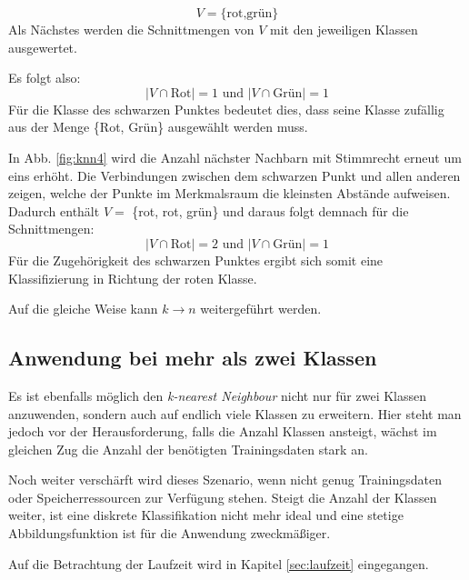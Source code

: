 \documentclass[fontsize=11pt]{scrartcl}
\begin{document}
                $$
                    V=\{\text{rot,grün}\}
                $$ 
                Als Nächstes werden die Schnittmengen von $V$ mit den jeweiligen Klassen ausgewertet.\par 
                Es folgt also:
                $$
                    |V \cap \text{Rot}| = 1 \text{ und } | V \cap \text{Grün} | = 1
                $$
                Für die Klasse des schwarzen Punktes bedeutet dies, dass seine Klasse zufällig aus der Menge \{Rot, Grün\} ausgewählt werden muss.     
                \par
            	In Abb. \ref{fig:knn4} wird die Anzahl nächster Nachbarn mit Stimmrecht erneut um eins erhöht. Die Verbindungen zwischen dem schwarzen Punkt und allen anderen zeigen, welche der Punkte im Merkmalsraum die kleinsten Abstände aufweisen. Dadurch enthält $V=$ \{rot, rot, grün\} und daraus folgt demnach für die Schnittmengen:
                $$
                    |V \cap \text{Rot} | = 2 \text{ und } | V \cap \text{Grün} | = 1
                $$
            	Für die Zugehörigkeit des schwarzen Punktes ergibt sich somit eine Klassifizierung in Richtung der roten Klasse.
            	
            	Auf die gleiche Weise kann $k \rightarrow n$ weitergeführt werden.
                        
            \subsection{Anwendung bei mehr als zwei Klassen}
                Es ist ebenfalls möglich den \emph{k-nearest Neighbour} nicht nur für zwei Klassen anzuwenden, sondern auch auf endlich viele Klassen zu erweitern. Hier steht man jedoch vor der Herausforderung, falls die Anzahl Klassen ansteigt, wächst im gleichen Zug die Anzahl der benötigten Trainingsdaten stark an.\cite{ertel2016}\par
                Noch weiter verschärft wird dieses Szenario, wenn nicht genug Trainingsdaten oder Speicherressourcen zur Verfügung stehen. 
                Steigt die Anzahl der Klassen weiter, ist eine diskrete Klassifikation nicht mehr ideal und eine stetige Abbildungsfunktion ist für die Anwendung zweckmäßiger.\cite{ertel2016}
                \par
                Auf die Betrachtung der Laufzeit wird in Kapitel \ref{sec:laufzeit} eingegangen.
                
\end{document}
